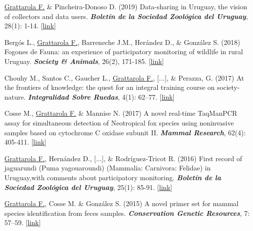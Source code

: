 \documentclass[9pt]{developercv} %
\begin{document}
\begin{etaremune}
\item \underline{Grattarola F.} \& Pincheira-Donoso D. (2019) Data-sharing in Uruguay, the vision of collectors and data users. \textit{\textbf{Boletín de la Sociedad Zoológica del Uruguay}}, 28(1): 1-14. [\href{https://doi.org/10.26462/28.1.1}{link}]

\item Bergós L., \underline{Grattarola F.}, Barreneche J.M., Herández D., \& González S. (2018) Fogones de Fauna: an experience of participatory monitoring of wildlife in rural Uruguay. \textit{\textbf{Society \& Animals}}, 26(2), 171-185. [\href{https://doi.org/10.1163/15685306-12341497}{link}]

\item Chouhy M., Santos C., Gaucher L., \underline{Grattarola F.}, [...], \& Perazza, G. (2017) At the frontiers of knowledge: the quest for an integral training course on society-nature. \textit{\textbf{Integralidad Sobre Ruedas}}, 4(1): 62–77. [\href{https://ojs.fhce.edu.uy/index.php/insoru/article/view/234}{link}]

\item Cosse M., \underline{Grattarola F.}  \& Mannise N. (2017) A novel real-time TaqMan\texttrademark PCR assay for simultaneous detection of Neotropical fox species using noninvasive samples based on cytochrome C oxidase subunit II. \textit{\textbf{Mammal Research}}, 62(4): 405-411. [\href{https://doi.org/10.1007/s13364-017-0328-y}{link}]

\item \underline{Grattarola F.}, Hernández D., [...], \& Rodríguez-Tricot R. (2016) First record of jaguarundi (Puma yagouaroundi) (Mammalia: Carnivora: Felidae) in Uruguay,with comments about  participatory monitoring. \textit{\textbf{Boletín de la Sociedad Zoológica del Uruguay}}, 25(1): 85-91. [\href{http://szu.org.uy/journal/index.php/Bol_SZU/article/view/23}{link}]

\item \underline{Grattarola F.}, Cosse M. \& González S. (2015) A novel primer set for mammal species identification from feces samples. \textit{\textbf{Conservation Genetic Resources}}, 7: 57–59. [\href{https://doi.org/10.1007/s12686-014-0359-5}{link}]

\end{etaremune}


\end{document}
